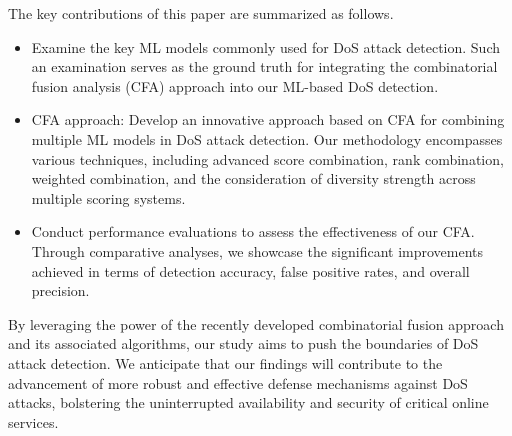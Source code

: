 The key contributions of this paper are summarized as follows.
\begin{itemize}
    \item %
    Examine the key ML models commonly used for DoS attack detection. Such an examination serves as the ground truth for integrating the combinatorial fusion analysis (CFA) approach into our ML-based DoS detection.
    \item CFA approach: Develop an innovative approach based on CFA for combining multiple ML models in DoS attack detection. %
    Our methodology encompasses various techniques, including advanced score combination, rank combination, weighted combination, and the consideration of diversity strength across multiple scoring systems.
    \item Conduct performance evaluations to assess the effectiveness of our CFA. Through comparative analyses, we showcase the significant improvements achieved in terms of detection accuracy, false positive rates, and overall precision.
\end{itemize}

By leveraging the power of the recently developed combinatorial fusion approach and its associated algorithms, our study aims to push the boundaries of DoS attack detection. We anticipate that our findings will contribute to the advancement of more robust and effective defense mechanisms against DoS attacks, bolstering the uninterrupted availability and security of critical online services.



